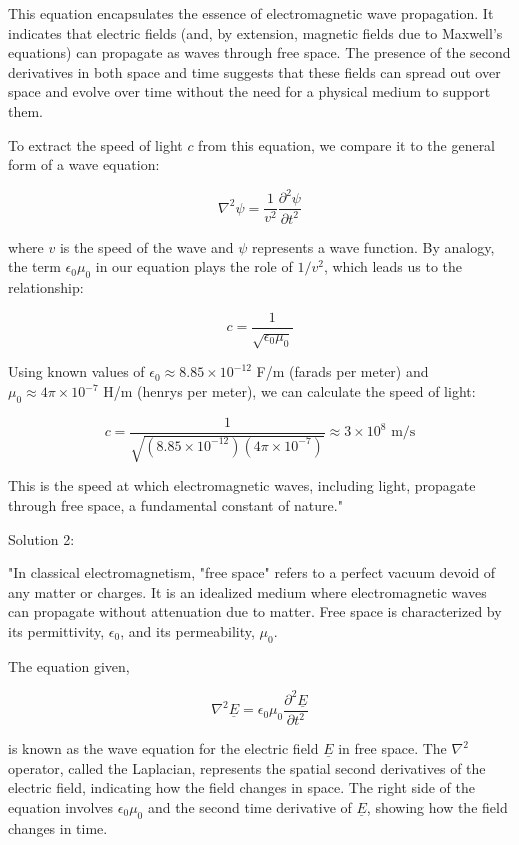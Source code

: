 This equation encapsulates the essence of electromagnetic wave propagation. It indicates that electric fields (and, by extension, magnetic fields due to Maxwell's equations) can propagate as waves through free space. The presence of the second derivatives in both space and time suggests that these fields can spread out over space and evolve over time without the need for a physical medium to support them.

To extract the speed of light $c$ from this equation, we compare it to the general form of a wave equation:

\[
\nabla^{2}\psi = \frac{1}{v^2}\frac{\partial^2 \psi}{\partial t^{2}}
\]

where $v$ is the speed of the wave and $\psi$ represents a wave function. By analogy, the term $\epsilon_{0}\mu_{0}$ in our equation plays the role of $1/v^2$, which leads us to the relationship:

\[
c = \frac{1}{\sqrt{\epsilon_{0}\mu_{0}}}
\]

Using known values of $\epsilon_{0} \approx 8.85 \times 10^{-12}$ F/m (farads per meter) and $\mu_{0} \approx 4\pi \times 10^{-7}$ H/m (henrys per meter), we can calculate the speed of light:

\[
c = \frac{1}{\sqrt{(8.85 \times 10^{-12})(4\pi \times 10^{-7})}} \approx 3 \times 10^8 \text{ m/s}
\]

This is the speed at which electromagnetic waves, including light, propagate through free space, a fundamental constant of nature."

Solution 2:

"In classical electromagnetism, "free space" refers to a perfect vacuum devoid of any matter or charges. It is an idealized medium where electromagnetic waves can propagate without attenuation due to matter. Free space is characterized by its permittivity, \(\epsilon_0\), and its permeability, \(\mu_0\).

The equation given,

\[
\nabla^{2}\underline{E} = \epsilon_{0}\mu_{0}\frac{\partial^2 \underline{E}}{\partial t^{2}}
\]

is known as the wave equation for the electric field \(\underline{E}\) in free space. The \(\nabla^{2}\) operator, called the Laplacian, represents the spatial second derivatives of the electric field, indicating how the field changes in space. The right side of the equation involves \(\epsilon_{0}\mu_{0}\) and the second time derivative of \(\underline{E}\), showing how the field changes in time.

